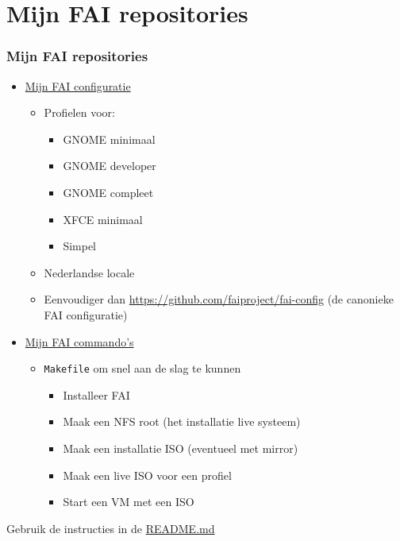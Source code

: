 \documentclass{beamer}
\newcommand{\myfaiconfig}{https://github.com/slspeek/fai}
\newcommand{\myfaicmds}{https://github.com/slspeek/fai-cmds}
\begin{document}
\section{Mijn FAI repositories}
\begin{frame}
\frametitle{Mijn FAI repositories}
\begin{itemize}
  \item \href{\myfaiconfig/}{Mijn FAI configuratie}
  \begin{itemize}
    \item Profielen voor:
    \begin{itemize}
      \item GNOME minimaal
      \item GNOME developer
      \item GNOME compleet
      \item XFCE minimaal
      \item Simpel
    \end{itemize}
    \item Nederlandse locale
    \item Eenvoudiger dan \url{https://github.com/faiproject/fai-config} (de canonieke FAI configuratie)
  \end{itemize}
  \item \href{\myfaicmds/}{Mijn FAI commando's}
  \begin{itemize}
    \item \texttt{Makefile} om snel aan de slag te kunnen
    \begin{itemize}
      \item Installeer FAI
      \item Maak een NFS root (het installatie live systeem)
      \item Maak een installatie ISO (eventueel met mirror)
      \item Maak een live ISO voor een profiel
      \item Start een VM met een ISO
    \end{itemize}
  \end{itemize}
\end{itemize}
Gebruik de instructies in de \href{\myfaicmds/blob/main/README.md}{README.md}
\end{frame}
\end{document}
